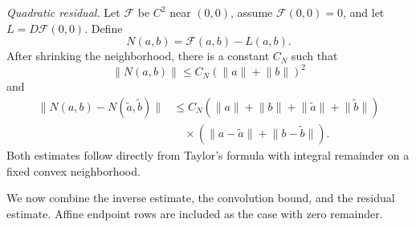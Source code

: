 \documentclass[twocolumn,nameyear,amsthm]{autart}
\newcommand{\norm}[1]{\lVert #1\rVert}
\numberwithin{equation}{section}
\begin{document}
\medskip\noindent\textit{Quadratic residual.}
Let $\mathcal F$ be $C^2$ near $(0,0)$, assume $\mathcal F(0,0)=0$, and let $L=D\mathcal F(0,0)$.  Define
\[
      N(a,b)=\mathcal F(a,b)-L(a,b).
\]
After shrinking the neighborhood, there is a constant $C_N$ such that
\[
      \norm{N(a,b)}\le C_N(\norm a+\norm b)^2
\]
and
\[
\begin{aligned}
      \norm{N(a,b)-N(\tilde a,\tilde b)}
      &\le C_N(\norm a+\norm b+\norm{\tilde a}+\norm{\tilde b})\\
      &\quad{}\times
          (\norm{a-\tilde a}+\norm{b-\tilde b}).
\end{aligned}
\]
Both estimates follow directly from Taylor's formula with integral remainder
on a fixed convex neighborhood.


We now combine the inverse estimate, the convolution bound, and the residual
estimate.  Affine endpoint rows are included as the case with zero remainder.
\end{document}
